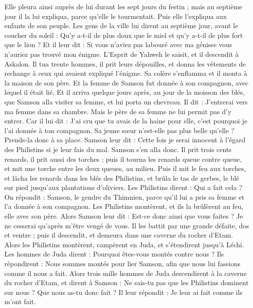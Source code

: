 \begin{multicols}{2}
Elle pleura ainsi auprès de lui durant les sept jours du festin ; mais au septième jour il la lui expliqua, parce qu'elle le tourmentait. Puis elle l'expliqua aux enfants de son peuple.
Les gens de la ville lui dirent au septième jour, avant le coucher du soleil : Qu'y a-t-il de plus doux que le miel et qu'y a-t-il de plus fort que le lion ? Et il leur dit : Si vous n'aviez pas labouré avec ma génisse vous n'auriez pas trouvé mon énigme.
L'Esprit de Yahweh le saisit, et il descendit à Askalon. Il tua trente hommes, il prit leurs dépouilles, et donna les vêtements de rechange à ceux qui avaient expliqué l'énigme. Sa colère s'enflamma et il monta à la maison de son père.
Et la femme de Samson fut donnée à son compagnon, avec lequel il était lié.
\VerseOne{}Et il arriva quelque jours après, au jour de la moisson des blés, que Samson alla visiter sa femme, et lui porta un chevreau. Il dit : J'entrerai vers ma femme dans sa chambre. Mais le père de sa femme ne lui permit pas d'y entrer.
Car il lui dit : J'ai cru que tu avais de la haine pour elle, c'est pourquoi je l'ai donnée à ton compagnon. Sa jeune sœur n'est-elle pas plus belle qu'elle ? Prends-la donc à sa place.
Samson leur dit : Cette fois je serai innocent à l'égard des Philistins si je leur fais du mal.
Samson s'en alla donc. Il prit trois cents renards, il prit aussi des torches ; puis il tourna les renards queue contre queue, et mit une torche entre les deux queues, au milieu.
Puis il mit le feu aux torches, et lâcha les renards dans les blés des Philistins, et brûla le tas de gerbes, le blé sur pied jusqu'aux plantations d'oliviers.
Les Philistins dirent : Qui a fait cela ? On répondit : Samson, le gendre du Thimnien, parce qu'il lui a pris sa femme et l'a donnée à son compagnon. Les Philistins montèrent, et ils la brûlèrent au feu, elle avec son père.
Alors Samson leur dit : Est-ce donc ainsi que vous faites ? Je ne cesserai qu'après m'être vengé de vous.
Il les battit par une grande défaite, dos et ventre ; puis il descendit, et demeura dans une caverne du rocher d'Etam.
Alors les Philistins montèrent, campèrent en Juda, et s'étendirent jusqu'à Léchi.
Les hommes de Juda dirent : Pourquoi êtes-vous montés contre nous ? Ils répondirent : Nous sommes montés pour lier Samson, afin que nous lui fassions comme il nous a fait.
Alors trois mille hommes de Juda descendirent à la caverne du rocher d'Etam, et dirent à Samson : Ne sais-tu pas que les Philistins dominent sur nous ? Que nous as-tu donc fait ? Il leur répondit : Je leur ai fait comme ils m'ont fait.

\end{multicols}

